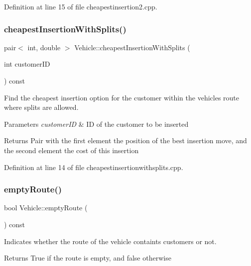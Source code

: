 Definition at line 15 of file cheapestinsertion2.\+cpp.

\mbox{\label{class_vehicle_aac0bd58150982e96f5ef36638a4c6ec4}} 
\subsubsection{\texorpdfstring{cheapest\+Insertion\+With\+Splits()}{cheapestInsertionWithSplits()}}
{\footnotesize\ttfamily pair$<$ int, double $>$ Vehicle\+::cheapest\+Insertion\+With\+Splits (\begin{DoxyParamCaption}\item[{int}]{customer\+ID }\end{DoxyParamCaption}) const}

Find the cheapest insertion option for the customer within the vehicle\textquotesingle{}s route where splits are allowed. 
\begin{DoxyParams}{Parameters}
{\em customer\+ID} & ID of the customer to be inserted \\
\hline
\end{DoxyParams}
\begin{DoxyReturn}{Returns}
Pair with the first element the position of the best insertion move, and the second element the cost of this insertion 
\end{DoxyReturn}


Definition at line 14 of file cheapestinsertionwithsplits.\+cpp.

\mbox{\label{class_vehicle_ac6bd9e1d4e12dae417a39f2b2f0095cc}} 
\subsubsection{\texorpdfstring{empty\+Route()}{emptyRoute()}}
{\footnotesize\ttfamily bool Vehicle\+::empty\+Route (\begin{DoxyParamCaption}{ }\end{DoxyParamCaption}) const\hspace{0.3cm}{\ttfamily [inline]}}

Indicates whether the route of the vehicle containts customers or not. \begin{DoxyReturn}{Returns}
True if the route is empty, and false otherwise 
\end{DoxyReturn}


